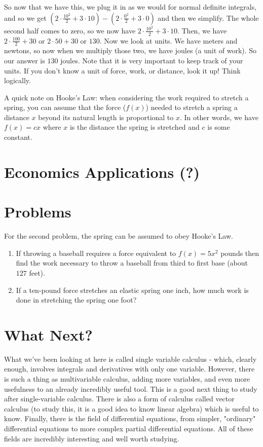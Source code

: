 So now that we have this, we plug it in as we would for normal definite integrals, and so we get $(2\cdot\frac{10^2}{2}+3\cdot 10) - (2\cdot\frac{0^2}{2}+3\cdot 0)$ and then we simplify. 
The whole second half comes to zero, so we now have $2\cdot\frac{10^2}{2}+3\cdot 10$. 
Then, we have $2\cdot \frac{100}{2}+ 30$ or $2\cdot 50 + 30$ or $130$. 
Now we look at units. 
We have meters and newtons, so now when we multiply those two, we have joules (a unit of work). 
So our answer is $130$ joules. 
Note that it is very important to keep track of your units. If you don't know a unit of force, work, or distance, look it up! Think logically.

A quick note on Hooke's Law: when considering the work required to stretch a spring, you can assume that the force ($f(x)$) needed to stretch a spring a distance $x$ beyond its natural length is proportional to $x$. 
In other words, we have $f(x) = cx$ where $x$ is the distance the spring is stretched and $c$ is some constant.
\chapter{Economics Applications (?)}

\chapter{Problems}
For the second problem, the spring can be assumed to obey Hooke's Law.

\begin{enumerate}
    \item If throwing a baseball requires a force equivalent to $f(x) = 5x^2$ pounds then find the work necessary to throw a baseball from third to first base (about $127$ feet).
    \item If a ten-pound force stretches an elastic spring one inch, how much work is done in stretching the spring one foot?
\end{enumerate}

\chapter{What Next?}

What we've been looking at here is called single variable calculus - which, clearly enough, involves integrals and derivatives with only one variable. 
However, there is such a thing as multivariable calculus, adding more variables, and even more usefulness to an already incredibly useful tool. 
This is a good next thing to study after single-variable calculus. 
There is also a form of calculus called vector calculus (to study this, it is a good idea to know
linear algebra) which is useful to know. 
Finally, there is the field of differential equations, from simpler, "ordinary" differential equations to more complex partial differential equations. 
All of these fields are incredibly interesting and well worth studying.
